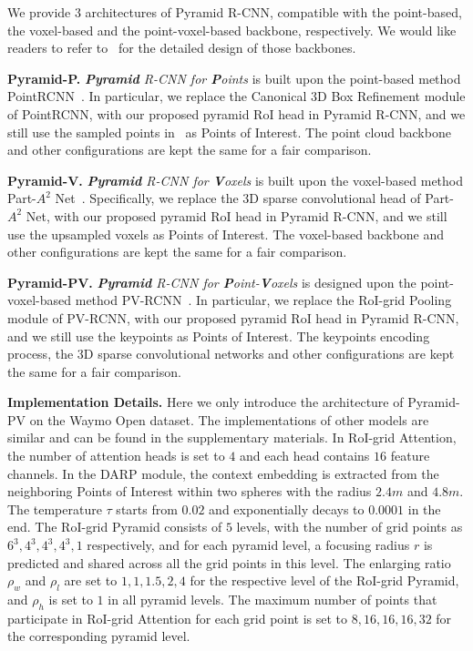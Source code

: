 \documentclass[10pt,twocolumn,letterpaper]{article}
\begin{document}
We provide $3$ architectures of Pyramid R-CNN, compatible with the point-based, the voxel-based and the point-voxel-based backbone, respectively. We would like readers to refer to~\cite{openpcdet} for the detailed design of those backbones. 

\noindent\textbf{Pyramid-P.} \textit{\textbf{Pyramid} R-CNN for \textbf{P}oints} is built upon the point-based method PointRCNN~\cite{shi2019pointrcnn}. In particular, we replace the Canonical 3D Box Refinement module of PointRCNN, with our proposed pyramid RoI head in Pyramid R-CNN, and we still use the sampled points in~\cite{shi2019pointrcnn} as Points of Interest. The point cloud backbone and other configurations are kept the same for a fair comparison.

\noindent\textbf{Pyramid-V.} \textit{\textbf{Pyramid} R-CNN for \textbf{V}oxels} is built upon the voxel-based method Part-$A^{2}$ Net~\cite{shi2020points}. Specifically, we replace the 3D sparse convolutional head of Part-$A^{2}$ Net, with our proposed pyramid RoI head in Pyramid R-CNN, and we still use the upsampled voxels as Points of Interest. The voxel-based backbone and other configurations are kept the same for a fair comparison.

\noindent\textbf{Pyramid-PV.} \textit{\textbf{Pyramid} R-CNN for \textbf{P}oint-\textbf{V}oxels} is designed upon the point-voxel-based method PV-RCNN~\cite{shi2020pv}. In particular, we replace the RoI-grid Pooling module of PV-RCNN, with our proposed pyramid RoI head in Pyramid R-CNN, and we still use the keypoints as Points of Interest. The keypoints encoding process, the 3D sparse convolutional networks and other configurations are kept the same for a fair comparison.

\noindent\textbf{Implementation Details.} Here we only introduce the architecture of Pyramid-PV on the Waymo Open dataset. The implementations of other models are similar and can be found in the supplementary materials. In RoI-grid Attention, the number of attention heads is set to $4$ and each head contains $16$ feature channels. In the DARP module, the context embedding is extracted from the neighboring Points of Interest within two spheres with the radius $2.4m$ and $4.8m$. The temperature $\tau$ starts from $0.02$ and exponentially decays to $0.0001$ in the end. The RoI-grid Pyramid consists of $5$ levels, with the number of grid points as $6^{3}, 4^{3}, 4^{3}, 4^{3}, 1$ respectively, and for each pyramid level, a focusing radius $r$ is predicted and shared across all the grid points in this level. The enlarging ratio $\rho_{w}$ and $\rho_{l}$ are set to $1, 1, 1.5, 2, 4$ for the respective level of the RoI-grid Pyramid, and $\rho_{h}$ is set to $1$ in all pyramid levels. The maximum number of points that participate in RoI-grid Attention for each grid point is set to $8, 16, 16, 16, 32$ for the corresponding pyramid level.
\end{document}
